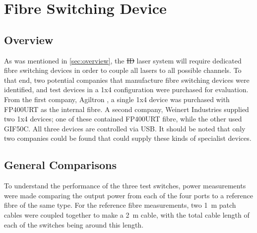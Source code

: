 \documentclass[a4paper,11pt]{article}
\providecommand{\DIFdeltex}[1]{{\protect\color{red}\sout{#1}}}                      %
\providecommand{\DIFdelbegin}{} %
\providecommand{\DIFdelend}{} %
\providecommand{\DIFdel}[1]{\texorpdfstring{\DIFdeltex{#1}}{}} %
\newcommand{\DIFscaledelfig}{0.5}
\newlength{\DIFdelgraphicswidth} %
\newlength{\DIFdelgraphicsheight} %
\newcommand{\DIFdelincludegraphics}[2][]{%
\sbox{\DIFdelgraphicsbox}{\DIFOincludegraphics[#1]{#2}}%
\settoboxwidth{\DIFdelgraphicswidth}{\DIFdelgraphicsbox} %
\settoboxtotalheight{\DIFdelgraphicsheight}{\DIFdelgraphicsbox} %
\scalebox{\DIFscaledelfig}{%
\parbox[b]{\DIFdelgraphicswidth}{\usebox{\DIFdelgraphicsbox}\\[-\baselineskip] \rule{\DIFdelgraphicswidth}{0em}}\llap{\resizebox{\DIFdelgraphicswidth}{\DIFdelgraphicsheight}{%
\setlength{\unitlength}{\DIFdelgraphicswidth}%
\begin{picture}(1,1)%
\thicklines\linethickness{2pt} %
{\color[rgb]{1,0,0}\put(0,0){\framebox(1,1){}}}%
{\color[rgb]{1,0,0}\put(0,0){\line( 1,1){1}}}%
{\color[rgb]{1,0,0}\put(0,1){\line(1,-1){1}}}%
\end{picture}%
}\hspace*{3pt}}} %
} %
\DeclareRobustCommand{\DIFdelbegin}{\DIFOdelbegin \let\includegraphics\DIFdelincludegraphics} %
\DeclareRobustCommand{\DIFdelend}{\DIFOaddend \let\includegraphics\DIFOincludegraphics} %
\begin{document}
\section{Fibre Switching Device}\label{sec:switch}

\subsection{Overview}
As was mentioned in \cref{sec:overview}, the \DIFdelbegin \DIFdel{ID }\DIFdelend laser system will require dedicated fibre switching devices in order to couple all lasers to all possible channels. To that end, two potential companies that manufacture fibre switching devices were identified, and test devices in a 1x4 configuration were purchased for evaluation. From the first company, Agiltron \cite{bib:agiltron}, a single 1x4 device was purchased with FP400URT as the internal fibre. A second company, Weinert Industries \cite{bib:weinert} supplied two 1x4 devices; one of these contained FP400URT fibre, while the other used GIF50C. All three devices are controlled via USB. It should be noted that only two companies could be found that could supply these kinds of specialist devices.

\subsection{General Comparisons}

To understand the performance of the three test switches, power measurements were made comparing the output power from each of the four ports to a reference fibre of the same type. For the reference fibre measurements, two 1~m patch cables were coupled together to make a 2~m cable, with the total cable length of each of the switches being around this length.
\end{document}
